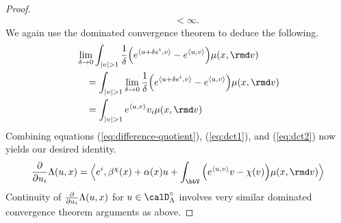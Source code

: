 \begin{proof}
\begin{align}
    &\quad < \infty.
  \end{align}
  We again use the dominated convergence theorem to deduce the following.
  \begin{align}
    &\lim_{\delta \rightarrow 0} \int_{|\markVar|> 1} \frac1\delta \Big( e^\prj{\momentVar+\delta \basisVec^i}{\markVar} - e^\prj{\momentVar}{\markVar} \Big) \affJump(\stateVar,\rmd\markVar) \tag*{} \\
    &\quad= \int_{|\markVar|> 1} \lim_{\delta\rightarrow0} \frac{1}{\delta} \Big( e^\prj{\momentVar+\delta \basisVec^i}{\markVar} - e^\prj{\momentVar}{\markVar}  \Big) \affJump(\stateVar,\rmd\markVar) \\
    \label{eq:dct2}
    &\quad= \int_{|\markVar|>1} e^\prj{\momentVar}{\markVar} \markVar_i  \affJump(\stateVar,\rmd\markVar)
  \end{align}
  Combining equations (\ref{eq:difference-quotient}), (\ref{eq:dct1}), and (\ref{eq:dct2}) now yields our desired identity.
  \begin{equation}
    \frac{\partial}{\partial\momentVar_i} \ode(\momentVar,\stateVar)
    = \Bprj{\basisVec^i}{\affDrift^\trunc(\stateVar) + \affDiff(\stateVar)\momentVar + \int_\vecSpace \Big( e^\prj{\momentVar}{\markVar} \markVar - \trunc(\markVar) \Big) \affJump(\stateVar,\rmd\markVar)}
  \end{equation}
  Continuity of $\frac{\partial}{\partial u_i} \Lambda(u, x)$ for $\momentVar \in \odeSpace^\circ$ involves very similar dominated convergence theorem arguments as above.
\end{proof}
